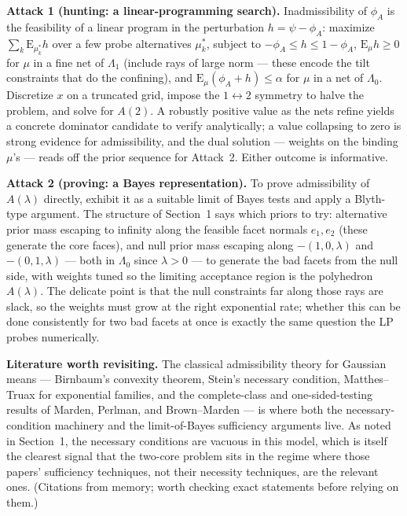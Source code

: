 \documentclass[12pt]{article}
\theoremstyle{remark}
\newcommand{\E}{\mathrm{E}}
\begin{document}
\textbf{Attack 1 (hunting: a linear-programming search).} Inadmissibility
of $\phi_A$ is the feasibility of a linear program in the perturbation
$h=\psi-\phi_A$: maximize $\sum_k \E_{\mu_k^*}h$ over a few probe
alternatives $\mu_k^*$, subject to $-\phi_A\le h\le1-\phi_A$,
$\E_\mu h\ge0$ for $\mu$ in a fine net of $\Lambda_1$ (include rays of
large norm --- these encode the tilt constraints that do the confining), and
$\E_\mu(\phi_A+h)\le\alpha$ for $\mu$ in a net of $\Lambda_0$. Discretize
$x$ on a truncated grid, impose the $1\leftrightarrow2$ symmetry to halve
the problem, and solve for $A(2)$. A robustly positive value as the nets
refine yields a concrete dominator candidate to verify analytically; a value
collapsing to zero is strong evidence for admissibility, and the dual
solution --- weights on the binding $\mu$'s --- reads off the prior sequence
for Attack~2. Either outcome is informative.

\textbf{Attack 2 (proving: a Bayes representation).} To prove admissibility
of $A(\lambda)$ directly, exhibit it as a suitable limit of Bayes tests and
apply a Blyth-type argument. The structure of Section~1 says which priors to
try: alternative prior mass escaping to infinity along the feasible facet
normals $e_1,e_2$ (these generate the core faces), and null prior mass
escaping along $-(1,0,\lambda)$ and $-(0,1,\lambda)$ --- both in $\Lambda_0$
since $\lambda>0$ --- to generate the bad facets from the null side, with
weights tuned so the limiting acceptance region is the polyhedron
$A(\lambda)$. The delicate point is that the null constraints far along
those rays are slack, so the weights must grow at the right exponential
rate; whether this can be done consistently for two bad facets at once is
exactly the same question the LP probes numerically.

\textbf{Literature worth revisiting.} The classical admissibility theory
for Gaussian means --- Birnbaum's convexity theorem, Stein's necessary
condition, Matthes--Truax for exponential families, and the
complete-class and one-sided-testing results of Marden, Perlman, and
Brown--Marden --- is where both the necessary-condition machinery and the
limit-of-Bayes sufficiency arguments live. As noted in Section~1, the
necessary conditions are vacuous in this model, which is itself the clearest
signal that the two-core problem sits in the regime where those papers'
sufficiency techniques, not their necessity techniques, are the relevant
ones. (Citations from memory; worth checking exact statements before
relying on them.)
\end{document}
